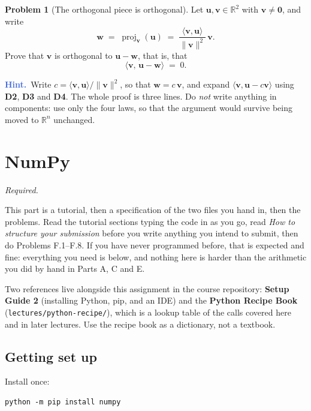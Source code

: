 \documentclass[11pt]{article}
\theoremstyle{definition}
\newtheorem{prob}{Problem}[section]
\newcommand{\hint}[1]{\par\smallskip\noindent
  {\small\sffamily\textcolor{RoyalBlue}{\textbf{Hint.}}\ #1}\par\smallskip}
\newcommand{\R}{\mathbb{R}}
\newcommand{\vc}[1]{\mathbf{#1}}
\newcommand{\norm}[1]{\lVert #1\rVert}
\newcommand{\ip}[2]{\langle #1,#2\rangle}
\newcommand{\proj}[2]{\operatorname{proj}_{#1}(#2)}
\begin{document}
\begin{prob}[The orthogonal piece is orthogonal]
Let $\vc{u},\vc{v}\in\R^{2}$ with $\vc{v}\neq\vc{0}$, and write
\[
  \vc{w} \;=\; \proj{\vc{v}}{\vc{u}} \;=\; \frac{\ip{\vc{v}}{\vc{u}}}{\norm{\vc{v}}^{2}}\,\vc{v} .
\]
Prove that $\vc{v}$ is orthogonal to $\vc{u}-\vc{w}$, that is, that
\[
  \ip{\vc{v}}{\,\vc{u}-\vc{w}} \;=\; 0 .
\]

\hint{Write $c=\ip{\vc{v}}{\vc{u}}/\norm{\vc{v}}^{2}$, so that $\vc{w}=c\,\vc{v}$,
and expand $\ip{\vc{v}}{\vc{u}-c\vc{v}}$ using \textbf{D2}, \textbf{D3} and
\textbf{D4}. The whole proof is three lines. Do \emph{not} write anything in
components: use only the four laws, so that the argument would survive being
moved to $\R^{n}$ unchanged.}
\end{prob}

\section{NumPy}
\emph{Required.}

\medskip
\noindent This part is a tutorial, then a specification of the two files you hand
in, then the problems. Read the tutorial sections typing the code in as you go,
read \emph{How to structure your submission} before you write anything you intend
to submit, then do Problems F.1--F.8. If you have never programmed before, that
is expected and fine: everything you need is below, and nothing here is harder
than the arithmetic you did by hand in Parts A, C and E.

\medskip
\noindent Two references live alongside this assignment in the course
repository: \textbf{Setup Guide 2} (installing Python, pip, and an IDE) and the
\textbf{Python Recipe Book} (\texttt{lectures/python-recipe/}), which is a
lookup table of the calls covered here and in later lectures. Use the recipe
book as a dictionary, not a textbook.

\subsection{Getting set up}

Install once:

\begin{lstlisting}
python -m pip install numpy
\end{lstlisting}
\end{document}
